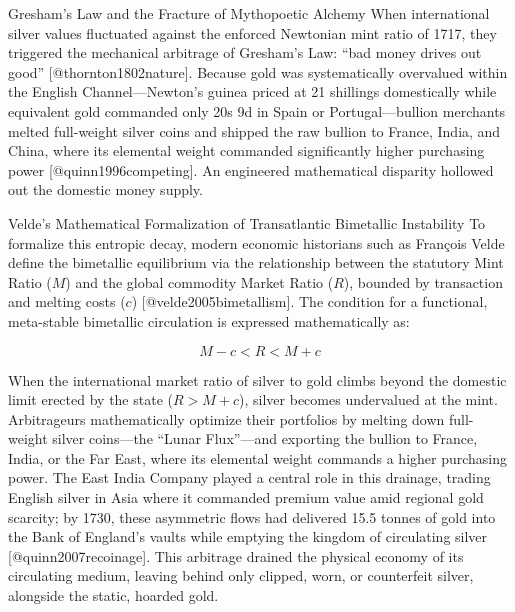 \documentclass[
  ignorenonframetext,
]{beamer}
\author{\texorpdfstring{}{}}
\date{}
\begin{document}
\begin{frame}{Gresham's Law and the Fracture of Mythopoetic Alchemy}
\protect{}\label{greshams-law-and-the-fracture-of-mythopoetic-alchemy}
When international silver values fluctuated against the enforced
Newtonian mint ratio of 1717, they triggered the mechanical arbitrage of
Gresham's Law: ``bad money drives out good'' {[}@thornton1802nature{]}.
Because gold was systematically overvalued within the English
Channel---Newton's guinea priced at 21 shillings domestically while
equivalent gold commanded only 20s 9d in Spain or Portugal---bullion
merchants melted full-weight silver coins and shipped the raw bullion to
France, India, and China, where its elemental weight commanded
significantly higher purchasing power {[}@quinn1996competing{]}. An
engineered mathematical disparity hollowed out the domestic money
supply.

\begin{block}{Velde's Mathematical Formalization of Transatlantic
Bimetallic Instability}
\protect{}\label{veldes-mathematical-formalization-of-transatlantic-bimetallic-instability}
To formalize this entropic decay, modern economic historians such as
François Velde define the bimetallic equilibrium via the relationship
between the statutory Mint Ratio (\(M\)) and the global commodity Market
Ratio (\(R\)), bounded by transaction and melting costs (\(c\))
{[}@velde2005bimetallism{]}. The condition for a functional, meta-stable
bimetallic circulation is expressed mathematically as:

\begin{equation}
\label{eq:bimetallic_bounds}
M - c < R < M + c
\end{equation}

When the international market ratio of silver to gold climbs beyond the
domestic limit erected by the state (\(R > M + c\)), silver becomes
undervalued at the mint. Arbitrageurs mathematically optimize their
portfolios by melting down full-weight silver coins---the ``Lunar
Flux''---and exporting the bullion to France, India, or the Far East,
where its elemental weight commands a higher purchasing power. The East
India Company played a central role in this drainage, trading English
silver in Asia where it commanded premium value amid regional gold
scarcity; by 1730, these asymmetric flows had delivered 15.5 tonnes of
gold into the Bank of England's vaults while emptying the kingdom of
circulating silver {[}@quinn2007recoinage{]}. This arbitrage drained the
physical economy of its circulating medium, leaving behind only clipped,
worn, or counterfeit silver, alongside the static, hoarded gold.
\end{block}


\end{frame}
\end{document}
